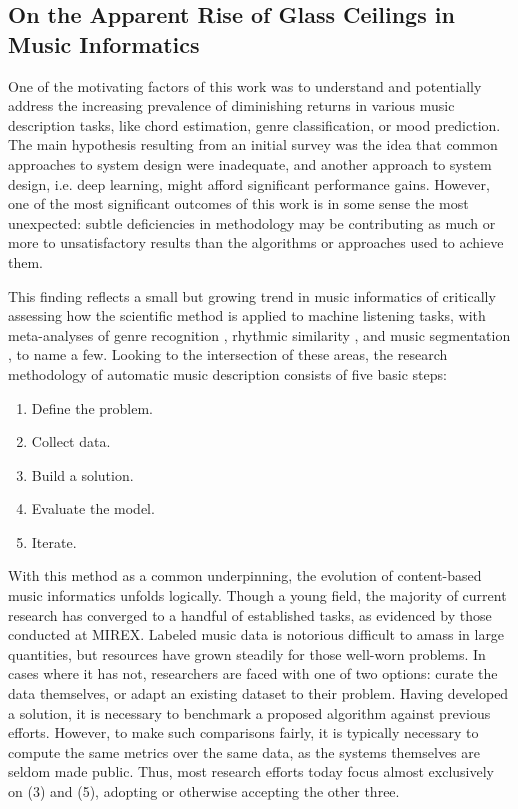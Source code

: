 \subsection{On the Apparent Rise of Glass Ceilings in Music Informatics}

One of the motivating factors of this work was to understand and potentially address the increasing prevalence of diminishing returns in various music description tasks, like chord estimation, genre classification, or mood prediction.
The main hypothesis resulting from an initial survey was the idea that common approaches to system design were inadequate, and another approach to system design, i.e. deep learning, might afford significant performance gains.
However, one of the most significant outcomes of this work is in some sense the most unexpected:
subtle deficiencies in methodology may be contributing as much or more to unsatisfactory results than the algorithms or approaches used to achieve them.

This finding reflects a small but growing trend in music informatics of critically assessing how the scientific method is applied to machine listening tasks, with meta-analyses of genre recognition \cite{Sturm2014Simple}, rhythmic similarity \cite{Esparza2014Genre}, and music segmentation \cite{Nieto2015Segmentation}, to name a few.
Looking to the intersection of these areas, the research methodology of automatic music description consists of five basic steps:

\begin{enumerate}
\item Define the problem.
\item Collect data.
\item Build a solution.
\item Evaluate the model.
\item Iterate.
\end{enumerate}

With this method as a common underpinning, the evolution of content-based music informatics unfolds logically.
Though a young field, the majority of current research has converged to a handful of established tasks, as evidenced by those conducted at MIREX.
Labeled music data is notorious difficult to amass in large quantities, but resources have grown steadily for those well-worn problems.
In cases where it has not, researchers are faced with one of two options:
curate the data themselves, or adapt an existing dataset to their problem.
Having developed a solution, it is necessary to benchmark a proposed algorithm against previous efforts.
However, to make such comparisons fairly, it is typically necessary to compute the same metrics over the same data, as the systems themselves are seldom made public.
Thus, most research efforts today focus almost exclusively on (3) and (5), adopting or otherwise accepting the other three.

